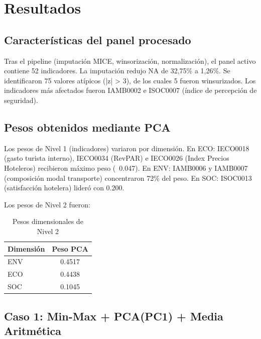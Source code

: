 
\chapter{Resultados}

\section{Características del panel procesado}

Tras el pipeline (imputación MICE, winsorización, normalización), el panel activo contiene 52 indicadores. La imputación redujo NA de 32,75\% a 1,26\%. Se identificaron 75 valores atípicos (|z| > 3), de los cuales 5 fueron winsurizados. Los indicadores más afectados fueron IAMB0002 e ISOC0007 (índice de percepción de seguridad).

\section{Pesos obtenidos mediante PCA}

Los pesos de Nivel 1 (indicadores) variaron por dimensión. En ECO: IECO0018 (gasto turista interno), IECO0034 (RevPAR) e IECO0026 (Index Precios Hoteleros) recibieron máximo peso (~0.047). En ENV: IAMB0006 y IAMB0007 (composición modal transporte) concentraron 72\% del peso. En SOC: ISOC0013 (satisfacción hotelera) lideró con 0.200.

Los pesos de Nivel 2 fueron:

\begin{table}[H]
    \centering
    \begin{tabular}{lc}
        \toprule
        \textbf{Dimensión} & \textbf{Peso PCA} \\
        \midrule
        ENV & 0.4517 \\
        ECO & 0.4438 \\
        SOC & 0.1045 \\
        \bottomrule
    \end{tabular}
    \caption{Pesos dimensionales de Nivel 2}
\end{table}

\section{Caso 1: Min-Max + PCA(PC1) + Media Aritmética}


